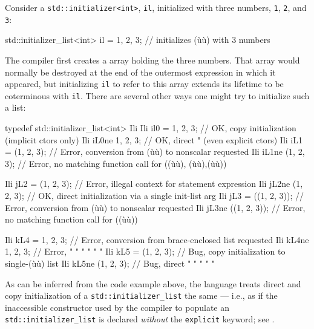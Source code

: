 Consider a \lstinline!std::initializer<int>!, \lstinline!il!, initialized with
three numbers, \lstinline!1!, \lstinline!2!, and \lstinline!3!:

\begin{emcppslisting}
std::initializer_list<int> il = {1, 2, 3};  // initializes (ù{}ù) with 3 numbers
\end{emcppslisting}
    

\noindent The compiler first creates a  array holding the three
numbers. That array would normally be destroyed at the end of the
outermost expression in which it appeared, but initializing \lstinline!il!
to refer to this array extends its lifetime to be coterminous with
\lstinline!il!. There are several other ways one might try to initialize
such a list:

\begin{emcppslisting}
typedef std::initializer_list<int> Ili
Ili il0 =  {1, 2, 3};   // OK, copy initialization (implicit ctors only)
Ili iL0ne  {1, 2, 3};   // OK, direct     "        (even explicit ctors)
Ili iL1 =  (1, 2, 3);   // Error, conversion from (ù{}ù) to nonscalar requested
Ili iL1ne  (1, 2, 3);   // Error, no matching function call for ((ù{}ù), (ù{}ù),(ù{}ù))

Ili jL2 = ({1, 2, 3});  // Error, illegal context for statement expression
Ili jL2ne ({1, 2, 3});  // OK, direct initialization via a single init-list arg
Ili jL3 = ((1, 2, 3));  // Error, conversion from (ù{}ù) to nonscalar requested
Ili jL3ne ((1, 2, 3));  // Error, no matching function call for ((ù{}ù))

Ili kL4 = {{1, 2, 3}};  // Error, conversion from brace-enclosed list requested
Ili kL4ne {{1, 2, 3}};  // Error,    "       "     "      "      "       "
Ili kL5 = {(1, 2, 3)};  // Bug, copy initialization to single-(ù{}ù) list
Ili kL5ne {(1, 2, 3)};  // Bug, direct       "      "    "      "     "
\end{emcppslisting}
    

\noindent As can be inferred from the code example above, the language treats
direct and copy initialization of a \lstinline!std::initializer_list! the
same --- i.e., as if the inaccessible constructor used by the compiler
to populate an \lstinline!std::initializer_list! is declared
\emph{without} the \lstinline!explicit! keyword; see .

